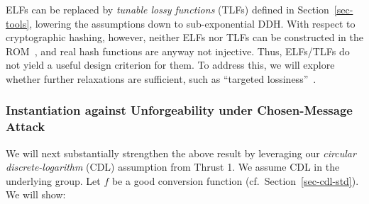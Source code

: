     ELFs can be replaced by \emph{tunable lossy functions} (TLFs) defined in Section~\ref{sec-tools}, lowering the assumptions down to sub-exponential DDH. With respect to cryptographic hashing, however, neither ELFs nor TLFs can be constructed in the ROM~\cite{TCC:FisRoh23}, and real hash functions are anyway not injective. Thus, ELFs/TLFs do not yield a useful design criterion for them. To address this, we will explore whether further relaxations are sufficient, such as ``targeted lossiness''~\cite{C:QuaWatWic21}.
 

\subsubsection{Instantiation against Unforgeability under Chosen-Message Attack}



We  will  next substantially strengthen  the above  result 
by leveraging our  \emph{circular discrete-logarithm} (CDL) assumption from Thrust 1. We assume CDL in the underlying group. Let $f$ be a good conversion function (cf.~Section~\ref{sec-cdl-std}).  We will show:

